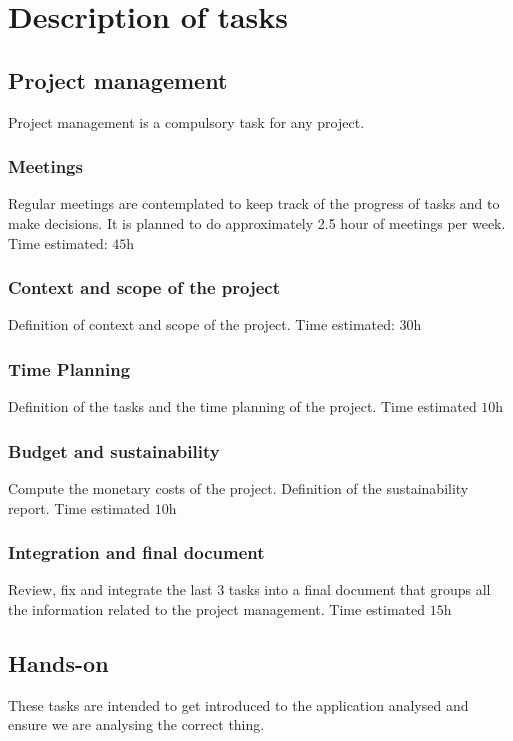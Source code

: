 \section{Description of tasks}

\subsection{Project management}

\justify
Project management is a compulsory task for any project. 

\subsubsection{Meetings}
\justify
Regular meetings are contemplated to keep track of the progress of tasks and to make decisions. It is planned to do approximately 2.5 hour of meetings per week. Time estimated: $\si{45\hour}$ 
\subsubsection{Context and scope of the project}
\justify
Definition of context and scope of the project. Time estimated: $\si{30\hour}$
\subsubsection{Time Planning}
\justify
Definition of the tasks and the time planning of the project. Time estimated $\si{10\hour}$
\subsubsection{Budget and sustainability}
\justify
Compute the monetary costs of the project. Definition of the sustainability report. Time estimated $\si{10\hour}$
\subsubsection{Integration and final document}
\justify
Review, fix and integrate the last 3 tasks into a final document that groups all the information related to the project management. Time estimated $\si{15\hour}$

\subsection{Hands-on}
\justify
These tasks are intended to get introduced to the application analysed and ensure we are analysing the correct thing.
